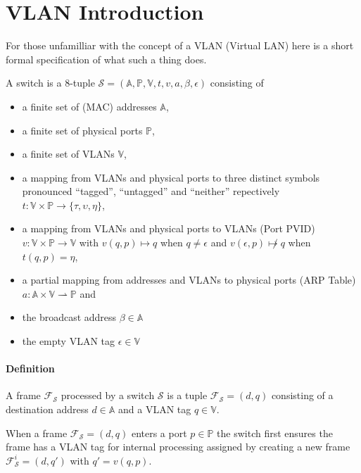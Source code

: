 \documentclass{article}
\begin{document}
\section{VLAN Introduction}

For those unfamilliar with the concept of a VLAN (Virtual LAN) here is a short
formal specification of what such a thing does.

A switch is a 8-tuple \( \mathcal{S} = (\mathbb{A}, \mathbb{P}, \mathbb{V}, t, v, a, \beta, \epsilon) \)
consisting of
\begin{itemize}
\item a finite set of (MAC) addresses \(\mathbb{A}\),
\item a finite set of physical ports \(\mathbb{P}\),
\item a finite set of VLANs \(\mathbb{V}\),
\item a mapping from VLANs and physical ports to three distinct symbols
  pronounced ``tagged'', ``untagged'' and ``neither'' repectively
  \( t : \mathbb{V} \times \mathbb{P} \rightarrow \{ \tau, \upsilon, \eta \} \),
\item a mapping from VLANs and physical ports to VLANs (Port PVID)\\
  \( v : \mathbb{V} \times \mathbb{P} \rightarrow \mathbb{V} \)
  with \(v(q, p) \mapsto q\) when \(q \neq \epsilon\)
  and \(v(\epsilon, p) \not\mapsto q \) when \( t(q,p) = \eta \),
\item a partial mapping from addresses and VLANs to physical ports (ARP Table)
  \( a : \mathbb{A} \times \mathbb{V} \rightharpoonup \mathbb{P} \) and
\item the broadcast address \(\beta \in \mathbb{A}\)
\item the empty VLAN tag \(\epsilon \in \mathbb{V}\)
\end{itemize}


\paragraph{Definition}
A frame \( \mathcal{F}_\mathcal{S} \)
processed by a switch \(\mathcal{S}\)
is a tuple \( \mathcal{F}_\mathcal{S} = (d, q) \)
consisting of a destination address \(d \in \mathbb{A} \)
and a VLAN tag \( q \in \mathbb{V} \).


When a frame \( \mathcal{F}_\mathcal{S} = (d, q) \)
enters a port \( p \in \mathbb{P}\)
the switch first ensures the frame has a VLAN tag for internal processing
assigned by creating a new frame \( \mathcal{F}_\mathcal{S}^i = (d, q')\)
with \(q' = v(q, p)\).
\end{document}
